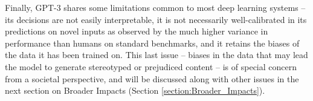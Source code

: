 Finally, GPT-3 shares some limitations common to most deep learning systems -- its decisions are not easily interpretable, it is not necessarily well-calibrated in its predictions on novel inputs as observed by the much higher variance in performance than humans on standard benchmarks, and it retains the biases of the data it has been trained on.  This last issue -- biases in the data that may lead the model to generate stereotyped or prejudiced content -- is of special concern from a societal perspective, and will be discussed along with other issues in the next section on Broader Impacts (Section \ref{section:Broader_Impacts}).

